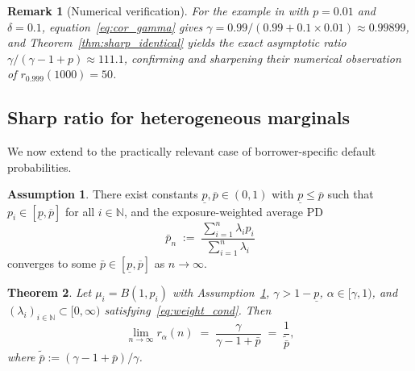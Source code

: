 \documentclass[11pt]{article}
\newtheorem{theorem}{Theorem}[section]
\newtheorem{remark}[theorem]{Remark}
\theoremstyle{definition}
\newtheorem{assumption}{Assumption}
\newcommand{\N}{\mathbb{N}}
\newcommand{\1}{\mathbf{1}}
\begin{document}
\begin{remark}[Numerical verification]\label{rem:numerical}
For the example in \citet[Section~5.2]{DVNSupper} with $p = 0.01$ and $\delta = 0.1$, equation~\eqref{eq:cor_gamma} gives $\gamma = 0.99/(0.99 + 0.1 \times 0.01) \approx 0.99899$, and Theorem~\ref{thm:sharp_identical} yields the exact asymptotic ratio $\gamma/(\gamma - 1 + p) \approx 111.1$, confirming and sharpening their numerical observation of $r_{0.999}(1000) = 50$.
\end{remark}

\subsection{Sharp ratio for heterogeneous marginals}

We now extend to the practically relevant case of borrower-specific default probabilities.

\begin{assumption}\label{ass:hetero}
There exist constants $\underline{p}, \overline{p} \in (0,1)$ with $\underline{p} \leq \overline{p}$ such that $p_i \in [\underline{p}, \overline{p}]$ for all $i \in \N$, and the exposure-weighted average PD
\begin{equation}\label{eq:avg_pd}
  \bar{p}_n \;:=\; \frac{\sum_{i=1}^n \lambda_i p_i}{\sum_{i=1}^n \lambda_i}
\end{equation}
converges to some $\bar{p} \in [\underline{p}, \overline{p}]$ as $n \to \infty$.
\end{assumption}

\begin{theorem}\label{thm:sharp_hetero}
Let $\mu_i = B(1, p_i)$ with Assumption~\ref{ass:hetero}, $\gamma > 1 - \underline{p}$, $\alpha \in [\gamma, 1)$, and $(\lambda_i)_{i \in \N} \subset [0, \infty)$ satisfying~\eqref{eq:weight_cond}. Then
\begin{equation}\label{eq:sharp_hetero}
  \lim_{n \to \infty} r_\alpha(n) \;=\; \frac{\gamma}{\gamma - 1 + \bar{p}} \;=\; \frac{1}{\tilde{\bar{p}}},
\end{equation}
where $\tilde{\bar{p}} := (\gamma - 1 + \bar{p})/\gamma$.
\end{theorem}
\end{document}
